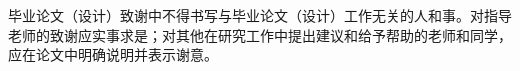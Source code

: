 
\begin{acknowledgements}
毕业论文（设计）致谢中不得书写与毕业论文（设计）工作无关的人和事。对指导老师的致谢应实事求是；对其他在研究工作中提出建议和给予帮助的老师和同学，应在论文中明确说明并表示谢意。
\end{acknowledgements}
